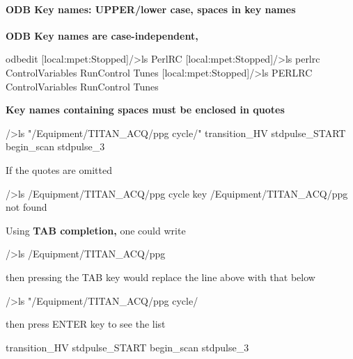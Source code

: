  \par
 \label{RC_odbedit_examples_idx_ODB_key_names}
\hypertarget{RC_odbedit_examples_idx_ODB_key_names}{}
 \hypertarget{RC_odbedit_examples_RC_odbedit_keynames}{}\paragraph{ODB Key names: UPPER/lower case, spaces in key names}\label{RC_odbedit_examples_RC_odbedit_keynames}
{\bfseries ODB Key names are case-\/independent,} 
\begin{DoxyCode}
 odbedit
[local:mpet:Stopped]/>ls
PerlRC
[local:mpet:Stopped]/>ls perlrc
ControlVariables
RunControl
Tunes
[local:mpet:Stopped]/>ls PERLRC
ControlVariables
RunControl
Tunes
\end{DoxyCode}
 {\bfseries Key names containing spaces must be enclosed in quotes} 
\begin{DoxyCode}
/>ls "/Equipment/TITAN_ACQ/ppg cycle/"
transition_HV
stdpulse_START
begin_scan
stdpulse_3
\end{DoxyCode}
 If the quotes are omitted 
\begin{DoxyCode}
/>ls /Equipment/TITAN_ACQ/ppg cycle
key /Equipment/TITAN_ACQ/ppg not found
\end{DoxyCode}
 Using {\bfseries TAB completion,} one could write 
\begin{DoxyCode}
/>ls /Equipment/TITAN_ACQ/ppg  
\end{DoxyCode}
 then pressing the TAB key would replace the line above with that below 
\begin{DoxyCode}
/>ls "/Equipment/TITAN_ACQ/ppg cycle/ 
\end{DoxyCode}
 then press ENTER key to see the list 
\begin{DoxyCode}
transition_HV
stdpulse_START
begin_scan
stdpulse_3
\end{DoxyCode}


\label{RC_odbedit_examples_idx_ODB_corrupted}
\hypertarget{RC_odbedit_examples_idx_ODB_corrupted}{}
 

